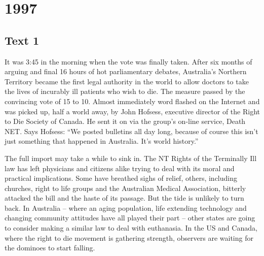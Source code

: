 \section{1997}
\subsection{Text 1}
It was 3:45 in the morning when the vote was finally taken. After six months of arguing and final 16 hours of hot parliamentary debates, Australia’s Northern Territory became the first legal authority in the world to allow doctors to take the lives of incurably ill patients who wish to die. The measure passed by the convincing vote of 15 to 10. Almost immediately word flashed on the Internet and was picked up, half a world away, by John Hofsess, executive director of the Right to Die Society of Canada. He sent it on via the group’s on-line service, Death NET. Says Hofsess: “We posted bulletins all day long, because of course this isn’t just something that happened in Australia. It’s world history.”

The full import may take a while to sink in. The NT Rights of the Terminally Ill law has left physicians and citizens alike trying to deal with its moral and practical implications. Some have breathed sighs of relief, others, including churches, right to life groups and the Australian Medical Association, bitterly attacked the bill and the haste of its passage. But the tide is unlikely to turn back. In Australia -- where an aging population, life extending technology and changing community attitudes have all played their part -- other states are going to consider making a similar law to deal with euthanasia. In the US and Canada, where the right to die movement is gathering strength, observers are waiting for the dominoes to start falling.

